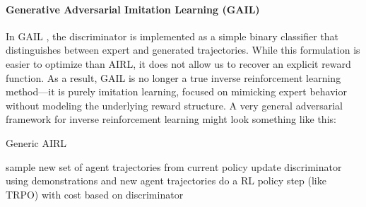 \paragraph{Generative Adversarial Imitation Learning (GAIL)}
In GAIL \cite{ho2016generativeadversarialimitationlearning}, the discriminator is implemented as a simple binary 
classifier that distinguishes between expert and generated trajectories. While 
this formulation is easier to optimize than AIRL, it does not allow us to recover an explicit reward function. As a 
result, GAIL is no longer 
a true inverse reinforcement learning method—it is purely imitation learning, focused on mimicking expert behavior without modeling the 
underlying reward structure.
\newline \newline
A very general adversarial framework for inverse reinforcement learning might look something like this:
\begin{algorithm}[H]
  \large
    \caption{Generic AIRL}\label{AIRL}%
    \begin{algorithmic}
        \STATE sample new set of agent trajectories from current policy
        \STATE update discriminator using demonstrations and new agent trajectories
        \STATE do a RL policy step (like TRPO) with cost based on discriminator
        \ENDFOR
    \end{algorithmic}
\end{algorithm}

